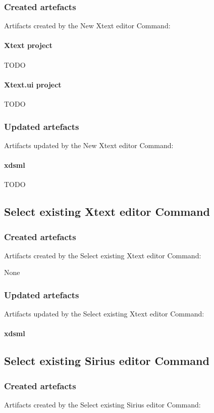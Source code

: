 \documentclass{gemoc} %
\begin{document}
\subsubsection{Created artefacts}
Artifacts created by the New Xtext editor Command:
\paragraph{Xtext project} 
TODO\paragraph{Xtext.ui project} 
TODO
\subsubsection{Updated artefacts}
Artifacts updated by the New Xtext editor Command:
\paragraph{xdsml} 
TODO

\subsection{Select existing Xtext editor Command}

\subsubsection{Created artefacts}
Artifacts created by the Select existing Xtext editor Command:

	None
\subsubsection{Updated artefacts}
Artifacts updated by the Select existing Xtext editor Command:
\paragraph{xdsml} 


\subsection{Select existing Sirius editor Command}

\subsubsection{Created artefacts}
Artifacts created by the Select existing Sirius editor Command:
\end{document}
